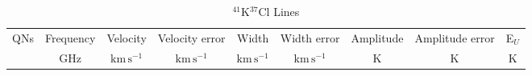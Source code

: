 \begin{table*}[htp]
\centering
\caption{$^{41}$K$^{37}$Cl Lines}
\begin{tabular}{ccccccccc}
\label{tab:41K37Cl_salt_lines}
QNs & Frequency & Velocity & Velocity error & Width & Width error & Amplitude & Amplitude error & E$_U$ \\
 & $\mathrm{GHz}$ & $\mathrm{km\,s^{-1}}$ & $\mathrm{km\,s^{-1}}$ & $\mathrm{km\,s^{-1}}$ & $\mathrm{km\,s^{-1}}$ & $\mathrm{K}$ & $\mathrm{K}$ & $\mathrm{K}$ \\
\hline
\hline
\end{tabular}

\par 
\end{table*}
